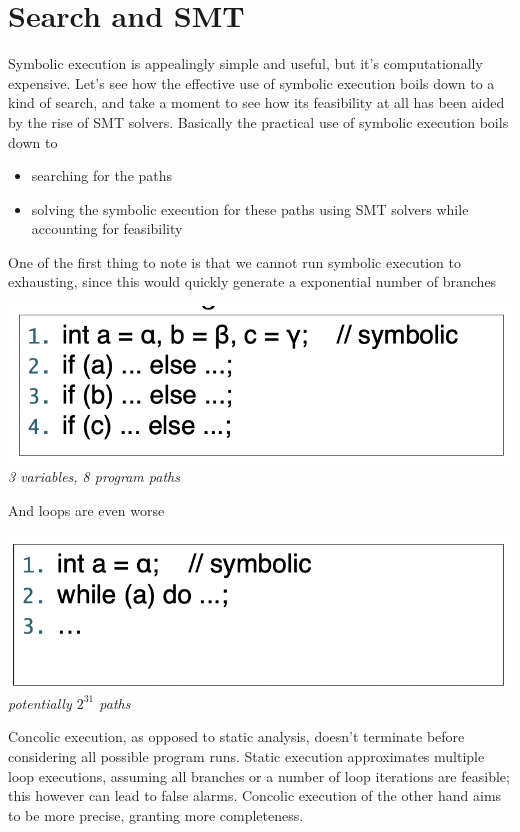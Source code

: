 \documentclass[11pt, oneside]{article}   	%
\begin{document}
\section*{Search and SMT}
Symbolic execution is appealingly simple and useful, but it's computationally expensive. Let's see how the effective use of symbolic execution boils down to a kind of search, and take a moment to see how its feasibility at all has been aided by the rise of SMT solvers. Basically the practical use of symbolic execution boils down to \begin{itemize}
\item searching for the paths
\item solving the symbolic execution for these paths using SMT solvers while accounting for feasibility
\end{itemize}
One of the first thing to note is that we cannot run symbolic execution to exhausting, since this would quickly generate a exponential number of branches
\begin{center}
\includegraphics[scale = 0.4]{pc1}\\
\emph{3 variables, 8 program paths}\\
\end{center}
And loops are even worse
\begin{center}
\includegraphics[scale = 0.4]{pc2}\\
\emph{potentially $2^{31}$ paths}
\end{center}
Concolic execution, as opposed to static analysis, doesn't terminate before considering all possible program runs. Static execution approximates multiple loop executions, assuming all branches or a number of loop iterations are feasible; this however can lead to false alarms. Concolic execution of the other hand aims to be more precise, granting more completeness.
\end{document}
